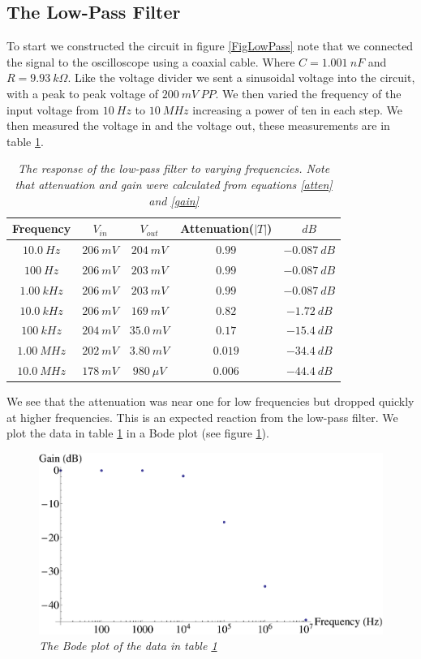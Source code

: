 \documentclass[11pt]{article}
\numberwithin{equation}{section}
\numberwithin{figure}{section}
\numberwithin{table}{section}
\begin{document}
\subsection{The Low-Pass Filter}
To start we constructed the circuit in figure \ref{FigLowPass} note that we connected the signal to the oscilloscope using a coaxial cable. Where $C = 1.001\ nF$ and $R = 9.93\ k\Omega$. Like the voltage divider we sent a sinusoidal voltage into the circuit, with a peak to peak voltage of $200\ mV\ PP$. We then varied the frequency of the input voltage from $10\ Hz$ to $10\ MHz$ increasing a power of ten in each step. We then measured the voltage in and the voltage out, these measurements are in table \ref{LowPass}.
\begin{table}[h]
\centering
\begin{tabular}{ccccc}
Frequency	&$V_{in}$	&$V_{out}$	&Attenuation($|T|$)	&$dB$\\
\hline
$10.0\ Hz$	&$206\ mV$	&$204\ mV$	&$0.99$		&$-0.087\ dB$\\
$100\ Hz$	&$206\ mV$	&$203\ mV$	&$0.99$		&$-0.087\ dB$\\
$1.00\ kHz$	&$206\ mV$	&$203\ mV$	&$0.99$		&$-0.087\ dB$\\
$10.0\ kHz$	&$206\ mV$	&$169\ mV$	&$0.82$		&$-1.72\ dB$\\
$100\ kHz$	&$204\ mV$	&$35.0\ mV$	&$0.17$		&$-15.4\ dB$\\
$1.00\ MHz$	&$202\ mV$	&$3.80\ mV$	&$0.019$	&$-34.4\ dB$\\
$10.0\ MHz$	&$178\ mV$	&$980\ \mu V$	&$0.006$	&$-44.4\ dB$\\
\end{tabular}
\caption{\textit{The response of the low-pass filter to varying frequencies. Note that attenuation and gain were calculated from equations \ref{atten} and \ref{gain}}}
\label{LowPass}
\end{table}

We see that the attenuation was near one for low frequencies but dropped quickly at higher frequencies. This is an expected reaction from the low-pass filter. We plot the data in table \ref{LowPass} in a Bode plot (see figure \ref{BodePlotLowPass}).
\begin{figure}[h]
\centering
\includegraphics[scale=0.60]{BodePlotLowPass.eps}
\caption{\textit{The Bode plot of the data in table \ref{LowPass}}}
\label{BodePlotLowPass}
\end{figure}
\end{document}
